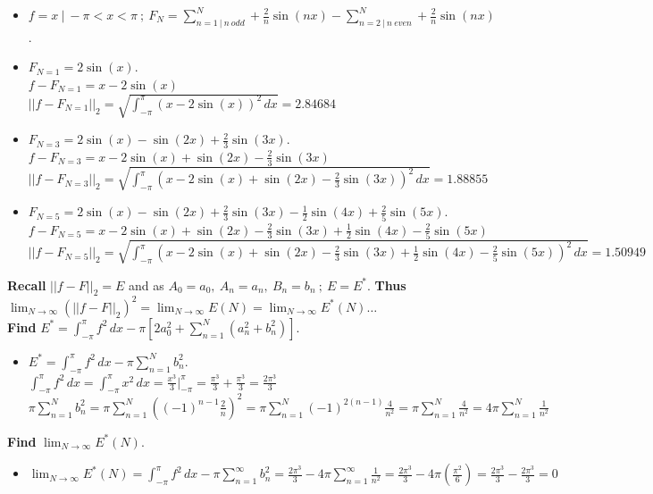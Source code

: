 \documentclass[10pt]{article}
\begin{document}
\begin{itemize}
    \item $ \displaystyle f = x \ | \ -\pi < x < \pi \ ; \ F_N = \sum_{n = 1 \ | \ n \ odd}^N + \frac{2}{n} \sin(nx) - \sum_{n = 2 \ | \ n \ even}^N + \frac{2}{n} \sin(nx) $. \\
    \item $ \displaystyle F_{N = 1} = 2 \sin(x) $. \\
    \subitem $ \displaystyle f - F_{N = 1}  = x - 2 \sin(x) $
    \subitem $ \displaystyle ||f-F_{N = 1}||_2  = \sqrt{\int_{-\pi }^{\pi } (x - 2 \sin(x))^2 \, dx} = 2.84684$
    \item $ \displaystyle F_{N = 3} = 2 \sin(x) - \sin(2x) + \frac{2}{3} \sin(3x) $. \\
    \subitem $ \displaystyle f - F_{N = 3}  = x - 2 \sin(x) + \sin(2x) - \frac{2}{3} \sin(3x) $
    \subitem $ \displaystyle ||f-F_{N = 3}||_2  = \sqrt{\int_{-\pi }^{\pi } (x - 2 \sin(x) + \sin(2x) - \frac{2}{3} \sin(3x))^2 \, dx} = 1.88855 $
    \item $ \displaystyle F_{N = 5} = 2 \sin(x) - \sin(2x) + \frac{2}{3} \sin(3x) - \frac{1}{2} \sin(4x) + \frac{2}{5} \sin(5x) $. \\
    \subitem $ \displaystyle f - F_{N = 5}  = x - 2 \sin(x) + \sin(2x) - \frac{2}{3} \sin(3x) + \frac{1}{2} \sin(4x) - \frac{2}{5} \sin(5x) $
    \subitem $ \displaystyle ||f-F_{N = 5}||_2  = \sqrt{\int_{-\pi }^{\pi } (x - 2 \sin(x) + \sin(2x) - \frac{2}{3} \sin(3x) + \frac{1}{2} \sin(4x) - \frac{2}{5} \sin(5x))^2 \, dx} = 1.50949 $
\end{itemize}

\noindent
\textbf{Recall} $ \displaystyle ||f-F||_2 = E $ and as $ A_0 = a_0, \ A_n = a_n, \ B_n = b_n \ ; \ E = E^* $. \textbf{Thus} $ \displaystyle \lim_{N\to\infty}(||f-F||_2)^2 = \lim_{N\to\infty}E(N) = \lim_{N\to\infty}E^*(N) \dots $ \\

\noindent
\textbf{Find} $ \displaystyle E^* = \int_{-\pi }^{\pi } f^2 \, dx - \pi [2 a^2_0 + \sum_{n = 1}^{N} (a^2_n + b^2_n)] $. \\
\begin{itemize}
    \item $ \displaystyle E^* = \int_{-\pi }^{\pi } f^2 \, dx - \pi \sum_{n = 1}^{N} b^2_n $. \\
    \subitem $ \displaystyle \int_{-\pi }^{\pi } f^2 \, dx = \int_{-\pi }^{\pi } x^2 \, dx = \frac{x^3}{3} \Big|_{-\pi}^{\pi} = \frac{\pi^3}{3} + \frac{\pi^3}{3} = \frac{2\pi^3}{3} $
    \subitem $ \displaystyle \pi \sum_{n = 1}^{N} b^2_n = \pi \sum_{n = 1}^{N} ((-1)^{n - 1} \frac{2}{n})^2 = \pi \sum_{n = 1}^{N} (-1)^{2(n-1)} \frac{4}{n^2} = \pi \sum_{n = 1}^{N} \frac{4}{n^2} = 4\pi \sum_{n = 1}^{N} \frac{1}{n^2} $
\end{itemize}

\noindent
\textbf{Find} $ \lim_{N\to\infty}E^*(N) $.
\begin{itemize}
    \item $ \displaystyle \lim_{N\to\infty}E^*(N) = \int_{-\pi }^{\pi } f^2 \, dx - \pi \sum_{n = 1}^{\infty} b^2_n = \frac{2 \pi^3}{3} - 4\pi \sum_{n = 1}^{\infty} \frac{1}{n^2} = \frac{2 \pi^3}{3} - 4\pi (\frac{\pi^2}{6}) = \frac{2 \pi^3}{3} - \frac{2 \pi^3}{3} = 0 $
\end{itemize}
\end{document}
